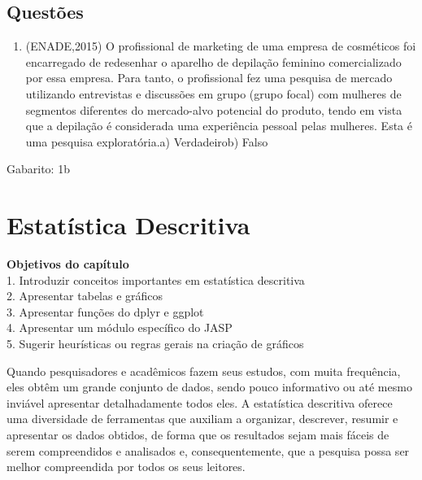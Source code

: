 \documentclass[
]{book}
\providecommand{\tightlist}{%
  \setlength{\itemsep}{0pt}\setlength{\parskip}{0pt}}
\begin{document}
\hypertarget{questuxf5es}{%
\section{Questões}\label{questuxf5es}}

\begin{question}

\begin{enumerate}
\def\labelenumi{\arabic{enumi}.}
\tightlist
\item
  (ENADE,2015) O profissional de marketing de uma empresa de cosméticos foi encarregado de redesenhar o aparelho de depilação feminino comercializado por essa empresa. Para tanto, o profissional fez uma pesquisa de mercado utilizando entrevistas e discussões em grupo (grupo focal) com mulheres de segmentos diferentes do mercado-alvo potencial do produto, tendo em vista que a depilação é considerada uma experiência pessoal pelas mulheres. Esta é uma pesquisa exploratória.a) Verdadeirob) Falso
\end{enumerate}

\end{question}

\begin{mirror}

Gabarito: 1b

\end{mirror}

\hypertarget{estatuxedstica-descritiva}{%
\chapter{Estatística Descritiva}\label{estatuxedstica-descritiva}}

\begin{objectives}
\textbf{Objetivos do capítulo}\\
1. Introduzir conceitos importantes em estatística descritiva\\
2. Apresentar tabelas e gráficos\\
3. Apresentar funções do dplyr e ggplot\\
4. Apresentar um módulo específico do JASP\\
5. Sugerir heurísticas ou regras gerais na criação de gráficos
\end{objectives}

Quando pesquisadores e acadêmicos fazem seus estudos, com muita frequência, eles obtêm um grande conjunto de dados, sendo pouco informativo ou até mesmo inviável apresentar detalhadamente todos eles. A estatística descritiva oferece uma diversidade de ferramentas que auxiliam a organizar, descrever, resumir e apresentar os dados obtidos, de forma que os resultados sejam mais fáceis de serem compreendidos e analisados e, consequentemente, que a pesquisa possa ser melhor compreendida por todos os seus leitores.
\end{document}
